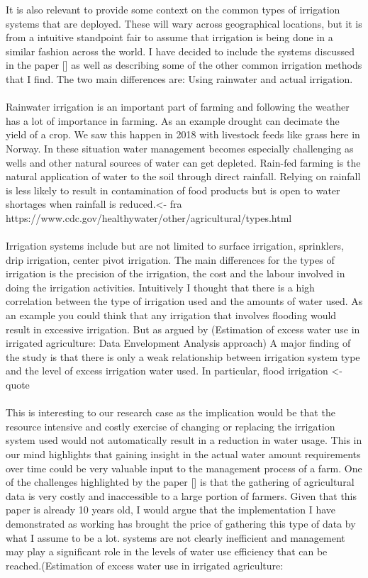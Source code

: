\documentclass[]{uiophd}
\begin{document}
It is also relevant to provide some context on the common types of irrigation systems that are deployed. These will wary across geographical locations, but it is from a intuitive standpoint fair to assume that irrigation is being done in a similar fashion across the world. I have decided to include the systems discussed in the paper [] as well as describing some of the  other common irrigation methods that I find. The two main differences are: Using rainwater and actual irrigation. \\\\
Rainwater irrigation is an important part of farming and following the weather has a lot of importance in farming. As an example drought can decimate the yield of a crop. We saw this happen in 2018 with livestock feeds like grass here in Norway. In these situation water management becomes especially challenging as wells and other natural sources of water can get depleted. Rain-fed farming is the natural application of water to the soil through direct rainfall. Relying on rainfall is less likely to result in contamination of food products but is open to water shortages when rainfall is reduced.<- fra https://www.cdc.gov/healthywater/other/agricultural/types.html
\\\\
Irrigation systems include but are not limited to surface irrigation, sprinklers, drip irrigation, center pivot irrigation. The main differences for the types of irrigation is the precision of the irrigation, the cost and the labour involved in doing the irrigation activities. Intuitively I thought that there is a high correlation between the type of irrigation used and the amounts of water used. As an example you could think that any irrigation that involves flooding would result in excessive irrigation. But as argued by (Estimation of excess water use in irrigated agriculture: Data Envelopment Analysis approach) A major finding of the study is that there is only a weak relationship between irrigation system type and the level of excess irrigation water used. In particular, flood irrigation <-quote \\\\
This is interesting to our research case as the implication would be that the resource intensive and costly exercise of changing or replacing the irrigation system used would not automatically result in a reduction in water usage. This in our mind highlights that gaining insight in the actual water amount requirements over time could be very valuable input to the management process of a farm. One of  the challenges highlighted by the paper [] is that the gathering of agricultural data is very costly and inaccessible to a large portion of farmers. Given that this paper is already 10 years old, I would argue that the implementation I have demonstrated as working has brought the price of gathering this type of data by what I assume to be a lot. systems are not clearly inefficient and management may play a significant role in the levels of water use efficiency that can be reached.(Estimation of excess water use in irrigated agriculture:
\end{document}
